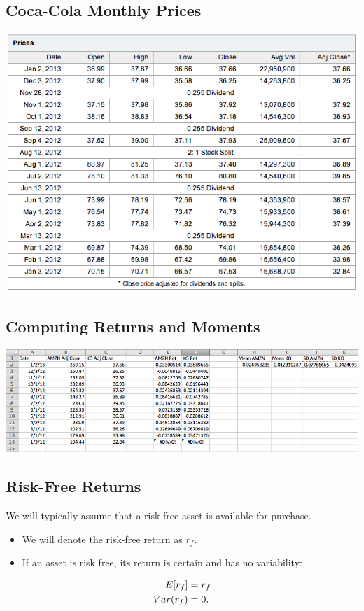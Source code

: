\documentclass[letterpaper,10pt,english]{sphinxmanual}
\begin{document}
\subsection{Coca-Cola Monthly Prices}
\label{risk:coca-cola-monthly-prices}
\includegraphics[width=6in]{ko-monthly.png}


\subsection{Computing Returns and Moments}
\label{risk:computing-returns-and-moments}
\includegraphics[width=6in]{amzn-coke-xls.png}


\subsection{Risk-Free Returns}
\label{risk:risk-free-returns}
We will typically assume that a risk-free asset is available for
purchase.
\begin{itemize}
\item {} 
We will denote the risk-free return as $r_f$.

\end{itemize}
\begin{itemize}
\item {} 
If an asset is risk free, its return is certain and has no
variability:

\end{itemize}
\begin{gather}
\begin{split}E[r_f] & = r_f \\
Var(r_f) & = 0.\end{split}\notag
\end{gather}
\end{document}
